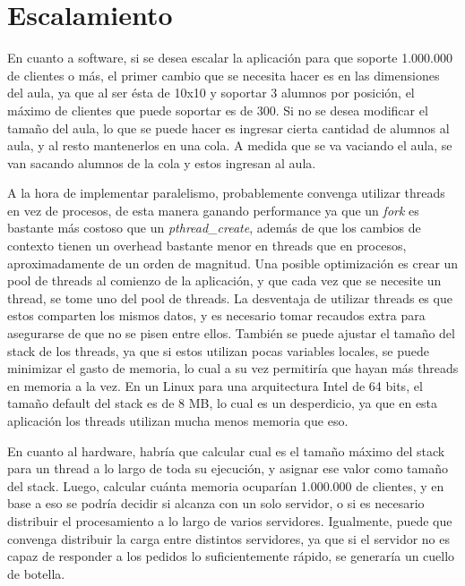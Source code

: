 \section{Escalamiento}
\label{sec:Esc}

En cuanto a software, si se desea escalar la aplicaci\'on para que soporte 1.000.000 de clientes o m\'as, el primer cambio que se necesita hacer es en las dimensiones del aula, 
ya que al ser \'esta de 10x10 y soportar 3 alumnos por posici\'on, el m\'aximo de clientes que puede soportar es de 300. Si no se desea modificar el tama\~no del aula, lo que se 
puede hacer es ingresar cierta cantidad de alumnos al aula, y al resto mantenerlos en una cola. A medida que se va vaciando el aula, se van sacando alumnos de la cola y estos ingresan 
al aula.

A la hora de implementar paralelismo, probablemente convenga utilizar threads en vez de procesos, de esta manera ganando performance ya que 
un \textit{fork} es bastante m\'as costoso que un \textit{pthread\_create}, adem\'as de que los cambios de contexto tienen un overhead bastante
menor en threads que en procesos, aproximadamente de un orden de magnitud. 
Una posible optimizaci\'on es crear un pool de threads al comienzo de la aplicaci\'on, y que cada vez que se necesite un thread, se tome
uno del pool de threads.
La desventaja de utilizar threads es que estos comparten los mismos
datos, y es necesario tomar recaudos extra para asegurarse de que no se pisen entre ellos. Tambi\'en se puede ajustar el tama\~no del stack de los 
threads, ya que si estos utilizan pocas variables locales, se puede minimizar el gasto de memoria, lo cual a su vez permitir\'ia que hayan m\'as
threads en memoria a la vez. En un Linux para una arquitectura Intel de 64 bits, el tama\~no default del stack es de 8 MB, lo cual es un desperdicio, ya que en esta aplicaci\'on
los threads utilizan mucha menos memoria que eso.


En cuanto al hardware, habr\'ia que calcular cual es el tama\~no m\'aximo del stack para un thread a lo largo de toda su ejecuci\'on,
y asignar ese valor como tama\~no del stack. Luego, calcular cu\'anta memoria ocupar\'ian 1.000.000 de clientes, y en base a eso se podr\'ia decidir
si alcanza con un solo servidor, o si es necesario distribuir el procesamiento a lo largo de varios servidores. Igualmente, puede que 
convenga distribuir la carga entre distintos servidores, ya que si el servidor no es capaz de responder a los pedidos lo suficientemente 
r\'apido, se generar\'ia un cuello de botella.